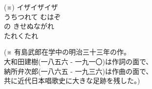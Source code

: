 ﻿\documentclass[10pt,a5j]{tarticle} %
\begin{document}
\begin{enumerate}
\begin{minipage}[c]{\blocksize}
	\end{minipage}
	\begin{minipage}[c]{0.5\hsize}
		\vspace{\linespace}
		(※) 
		イザイザイザ\\
		うちつれて
		むはぞ\\
		の
		きせぬながれ\\
		たれくたれ\\
	\end{minipage}
	\begin{minipage}[c]{0.5\hsize}
		\vspace{\linespace}
		(※ 有島武郎在学中の明治三十三年の作。\\
		大和田建樹(一八五六 - 一九一〇)は作詞の面で、\\
		納所弁次郎(一八六五 - 一九三六)は作曲の面で、\\
		共に近代日本唱歌史に大きな足跡を残した。)
	\end{minipage}
\end{enumerate}
\end{document}
